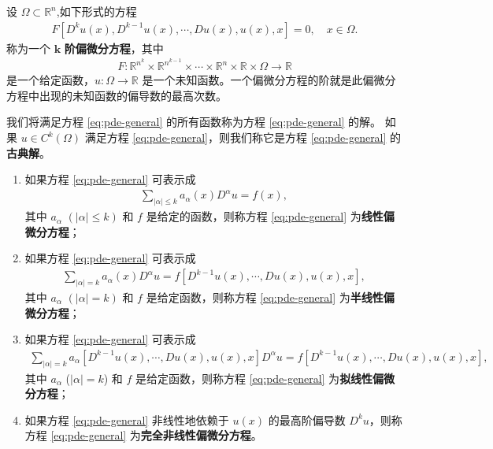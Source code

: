\documentclass[../../main.tex]{subfiles}%
\begin{document}
\begin{definition}
设 $\Omega\subset \mathbb{R}^n$,如下形式的方程
\begin{align}
F[D^k u(x), D^{k-1}u(x), \cdots, Du(x), u(x), x] = 0,\quad x\in\Omega. \label{eq:pde-general}
\end{align}
称为一个 $\boldsymbol{k}$ \textbf{阶偏微分方程}，其中
\begin{align*}
F:\mathbb{R}^{n^k}\times\mathbb{R}^{n^{k-1}}\times\cdots\times\mathbb{R}^n\times\mathbb{R}\times\Omega\to\mathbb{R}
\end{align*}
是一个给定函数，$u:\Omega\to\mathbb{R}$ 是一个未知函数。一个偏微分方程的阶就是此偏微分方程中出现的未知函数的偏导数的最高次数。

我们将满足方程 \eqref{eq:pde-general} 的所有函数称为方程 \eqref{eq:pde-general} 的解。
如果 $u\in C^k(\Omega)$ 满足方程 \eqref{eq:pde-general}，则我们称它是方程 \eqref{eq:pde-general} 的\textbf{古典解}。
\begin{enumerate}[(1)]
\item 如果方程 \eqref{eq:pde-general} 可表示成
\begin{align*}
\sum_{|\alpha|\leqslant k} a_{\alpha}(x) D^{\alpha} u = f(x),
\end{align*}
其中 $a_{\alpha}$ $(|\alpha|\leqslant k)$ 和 $f$ 是给定的函数，则称方程 \eqref{eq:pde-general} 为\textbf{线性偏微分方程}；
\item 如果方程 \eqref{eq:pde-general} 可表示成
\begin{align*}
\sum_{|\alpha|=k} a_{\alpha}(x) D^{\alpha} u = f[D^{k-1}u(x), \cdots, Du(x), u(x), x],
\end{align*}
其中 $a_{\alpha}$ $(|\alpha|=k)$ 和 $f$ 是给定函数，则称方程 \eqref{eq:pde-general} 为\textbf{半线性偏微分方程}；
\item 如果方程 \eqref{eq:pde-general} 可表示成
\begin{align*}
\sum_{|\alpha|=k} a_{\alpha}[D^{k-1}u(x), \cdots, Du(x), u(x), x] D^{\alpha} u
= f[D^{k-1}u(x), \cdots, Du(x), u(x), x],
\end{align*}
其中 $a_{\alpha}$ ($|\alpha|=k$) 和 $f$ 是给定函数，则称方程 \eqref{eq:pde-general} 为\textbf{拟线性偏微分方程}；
\item 如果方程 \eqref{eq:pde-general} 非线性地依赖于 $u(x)$ 的最高阶偏导数 $D^k u$，则称方程 \eqref{eq:pde-general} 为\textbf{完全非线性偏微分方程}。
\end{enumerate}
\end{definition}
\end{document}
